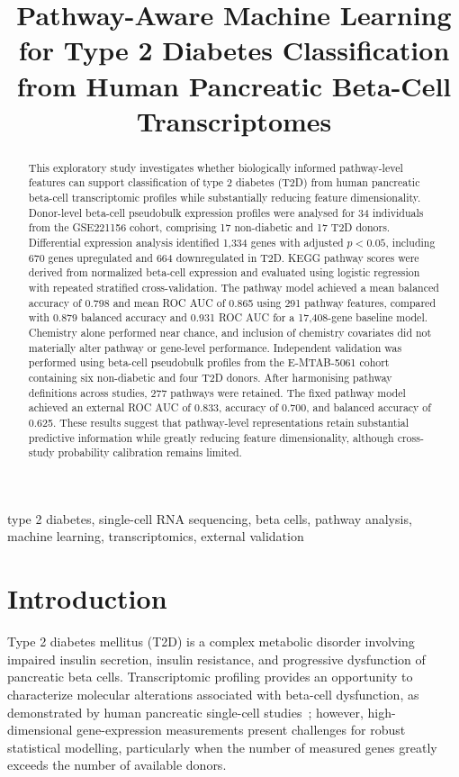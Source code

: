 \documentclass[conference]{IEEEtran}
\title{Pathway-Aware Machine Learning for Type 2 Diabetes Classification from Human Pancreatic Beta-Cell Transcriptomes}
\author{
\IEEEauthorblockN{Tharuniya Anpalakan}
\IEEEauthorblockA{
Department of Applied Sciences\\
Northumbria University\\
Newcastle upon Tyne, United Kingdom\\
w25070895@northumbria.ac.lk
}
}
\begin{document}
\maketitle

\begin{abstract}
This exploratory study investigates whether biologically informed pathway-level features can support classification of type 2 diabetes (T2D) from human pancreatic beta-cell transcriptomic profiles while substantially reducing feature dimensionality. Donor-level beta-cell pseudobulk expression profiles were analysed for 34 individuals from the GSE221156 cohort, comprising 17 non-diabetic and 17 T2D donors. Differential expression analysis identified 1,334 genes with adjusted $p<0.05$, including 670 genes upregulated and 664 downregulated in T2D. KEGG pathway scores were derived from normalized beta-cell expression and evaluated using logistic regression with repeated stratified cross-validation. The pathway model achieved a mean balanced accuracy of 0.798 and mean ROC AUC of 0.865 using 291 pathway features, compared with 0.879 balanced accuracy and 0.931 ROC AUC for a 17,408-gene baseline model. Chemistry alone performed near chance, and inclusion of chemistry covariates did not materially alter pathway or gene-level performance. Independent validation was performed using beta-cell pseudobulk profiles from the E-MTAB-5061 cohort containing six non-diabetic and four T2D donors. After harmonising pathway definitions across studies, 277 pathways were retained. The fixed pathway model achieved an external ROC AUC of 0.833, accuracy of 0.700, and balanced accuracy of 0.625. These results suggest that pathway-level representations retain substantial predictive information while greatly reducing feature dimensionality, although cross-study probability calibration remains limited.
\end{abstract}

\begin{IEEEkeywords}
type 2 diabetes, single-cell RNA sequencing, beta cells, pathway analysis, machine learning, transcriptomics, external validation
\end{IEEEkeywords}

\section{Introduction}

Type 2 diabetes mellitus (T2D) is a complex metabolic disorder involving impaired insulin secretion, insulin resistance, and progressive dysfunction of pancreatic beta cells. Transcriptomic profiling provides an opportunity to characterize molecular alterations associated with beta-cell dysfunction, as demonstrated by human pancreatic single-cell studies~\cite{muraro2016,baron2016,segerstolpe2016}; however, high-dimensional gene-expression measurements present challenges for robust statistical modelling, particularly when the number of measured genes greatly exceeds the number of available donors.
\end{document}
